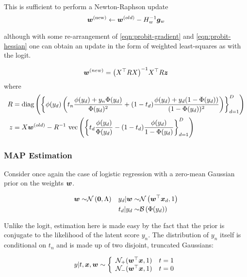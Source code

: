 This is sufficient to perform a Newton-Raphson update
\begin{align}
\bm w^{(\text{new})} \leftarrow \bm w^{(old)} - H_w^{-1} \bm g_w
\end{align}

although with some re-arrangement of \eqref{eqn:probit-gradient} and \eqref{eqn:probit-hessian} one can obtain an update in the form of weighted least-squares as with the logit.

\begin{align}
\bm w^{(new)} = {\left( X^\top R X \right)}^{-1}X^\top R \bm z
\end{align}
where
\begin{align}
R & = \text{diag} \left( {\left\{ \phi(y_d) \left(
    t_n \frac{\phi(y_d) + y_n \Phi(y_d)}{\Phi(y_d)^2} + (1-t_d) \frac{\phi(y_d) + y_d (1-\Phi(y_d))}{(1 - \Phi(y_d))^2}
\right) \right\}_{d=1}^D} \right) \\
z & = X \bm w^{(old)}  - {R}^{-1} \text{ vec} \left(\left\{ t_d \frac{\phi(y_d)}{\Phi(y_d)} - (1 - t_d) \frac{\phi(y_d)}{1 - \Phi(y_d)} \right\}_{d=1}^D\right)
\end{align}



\subsubsection*{MAP Estimation}
Consider once again the case of logistic regression with a zero-mean Gaussian prior on the weights $\bm w$.

\begin{align}
\bm w \sim & \mathcal{N} \left( {\bm 0}, {\Lambda} \right) & y_d | \bm w \sim & \mathcal{N} \left( {\bm w^\top\bm x_d}, {1} \right) \\
\text{ } & \text{ } & t_d | y_d \sim & \mathcal{B}\left( \Phi(y_d) \right)
\end{align}

Unlike the logit, estimation here is made easy by the fact that the prior is conjugate to the likelihood of the latent score $y_n$. The distribution of $y_n$ itself is conditional on $t_n$ and is made up of two disjoint, truncated Gaussians:

\begin{align}
y | t, \bm x, \bm w \sim \left\{ \begin{array}{lr} \mathcal{N}_+ (\bm w^\top\bm x, 1) & t = 1 \\
\mathcal{N}_- (\bm w^\top\bm x, 1) & t = 0
 \end{array} \right.
\end{align}


